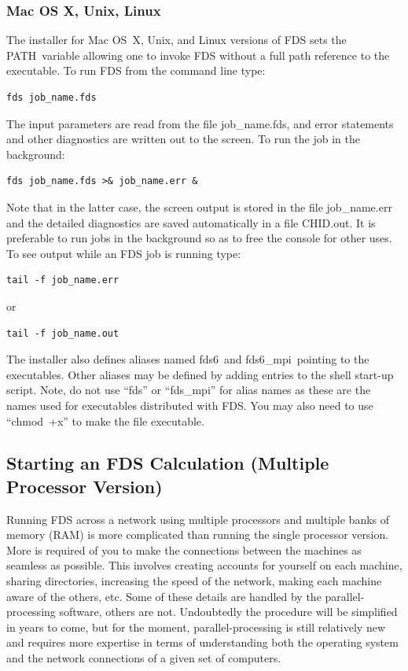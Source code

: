 \documentclass[11pt]{book}
\begin{document}
\subsubsection{Mac OS X, Unix, Linux}

The installer for Mac OS~X, Unix, and Linux versions of FDS sets
the {\ct PATH}\ variable allowing one to invoke FDS without a full
path reference to the executable.  To run FDS from the command
line type:
\begin{lstlisting}
fds job_name.fds
\end{lstlisting}
The input parameters are read from the file {\ct job\_name.fds},
and error statements and other diagnostics are written out to the
screen. To run the job in the background:
\begin{lstlisting}
fds job_name.fds >& job_name.err &
\end{lstlisting}
Note that in the latter case, the screen output is stored in the
file {\ct job\_name.err} and the detailed diagnostics are saved
automatically in a file {\ct CHID.out}. It is preferable to run jobs in the background
so as to free the console for other uses. To see output while an
FDS job is running type:
\begin{lstlisting}
tail -f job_name.err
\end{lstlisting}
or
\begin{lstlisting}
tail -f job_name.out
\end{lstlisting}
The installer also defines aliases named {\ct fds6}\ and {\ct fds6\_mpi}\
pointing to the executables. Other aliases may be defined by
adding entries to the shell start-up script. Note, do not use
``{\ct fds}'' or ``{\ct fds\_mpi}'' for alias names as these are
the names used for executables distributed with FDS. You may also
need to use ``chmod~+x'' to make the file executable.


\subsection{Starting an FDS Calculation (Multiple Processor Version)}
\label{info:parallelprocessing}

Running FDS across a network using multiple processors and multiple
banks of memory (RAM) is more complicated than running the single
processor version.  More is required of you to make the
connections between the machines as seamless as possible. This
involves creating accounts for yourself on each machine, sharing
directories, increasing the speed of the network, making each machine
aware of the others, etc.  Some of these details are handled by
the parallel-processing software, others are not. Undoubtedly the
procedure will be simplified in years to come, but for the moment,
parallel-processing is still relatively new and requires more
expertise in terms of understanding both the operating system and the
network connections of a given set of computers.
\end{document}
